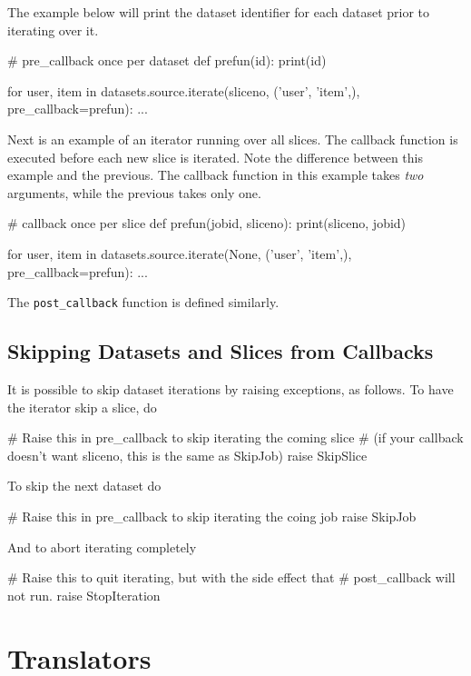 The example below will print the dataset identifier for each dataset
prior to iterating over it.
\begin{python}
# pre_callback once per dataset
def prefun(id):
    print(id)

for user, item in datasets.source.iterate(sliceno, ('user', 'item',),
                                       pre_callback=prefun):
    ...
\end{python}
Next is an example of an iterator running over all slices.  The
callback function is executed before each new slice is iterated.  Note
the difference between this example and the previous.  The callback
function in this example takes \emph{two} arguments, while the
previous takes only one.
\begin{python}
# callback once per slice
def prefun(jobid, sliceno):
    print(sliceno, jobid)

for user, item in datasets.source.iterate(None, ('user', 'item',),
                                       pre_callback=prefun):
    ...
\end{python}
The \texttt{post\_callback} function is defined similarly.



\subsection*{Skipping Datasets and Slices from Callbacks}
It is possible to skip dataset iterations by raising exceptions, as
follows.  To have the iterator skip a slice, do
\begin{python}
# Raise this in pre_callback to skip iterating the coming slice
# (if your callback doesn't want sliceno, this is the same as SkipJob)
raise SkipSlice
\end{python}
To skip the next dataset do
\begin{python}
# Raise this in pre_callback to skip iterating the coing job
raise SkipJob
\end{python}
And to abort iterating completely
\begin{python}
# Raise this to quit iterating, but with the side effect that
# post_callback will not run.
raise StopIteration
\end{python}






\section{Translators}
\label{sec:translators}

